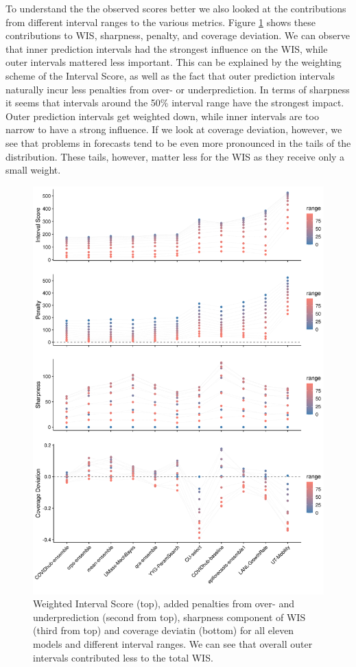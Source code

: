 \documentclass[
]{book}
\begin{document}
To understand the the observed scores better we also looked at the contributions from different interval ranges to the various metrics. Figure \ref{fig:scores-ranges} shows these contributions to WIS, sharpness, penalty, and coverage deviation. We can observe that inner prediction intervals had the strongest influence on the WIS, while outer intervals mattered less important. This can be explained by the weighting scheme of the Interval Score, as well as the fact that outer prediction intervals naturally incur less penalties from over- or underprediction. In terms of sharpness it seems that intervals around the 50\% interval range have the strongest impact. Outer prediction intervals get weighted down, while inner intervals are too narrow to have a strong influence. If we look at coverage deviation, however, we see that problems in forecasts tend to be even more pronounced in the tails of the distribution. These tails, however, matter less for the WIS as they receive only a small weight.

\begin{figure}
\includegraphics[width=1\linewidth]{../visualisation/chapter-5-results/scenario-baseline/all-range-plots} \caption{Weighted Interval Score (top), added penalties from over- and underprediction (second from top), sharpness component of WIS (third from top) and coverage deviatin (bottom) for all eleven models and different interval ranges. We can see that overall outer intervals contributed less to the total WIS.}\label{fig:scores-ranges}
\end{figure}
\end{document}
